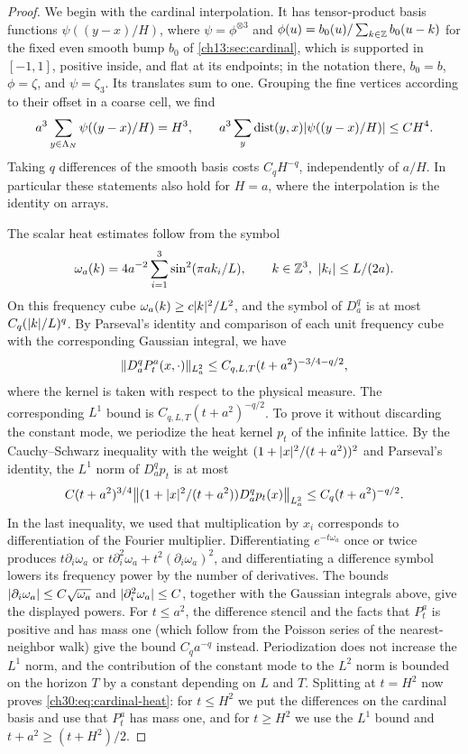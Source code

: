\begin{proof}
We begin with the cardinal interpolation. It has tensor-product basis functions $\psi((y-x)/H)$, where $\psi=\phi^{\otimes3}$ and $\phi(u)=b_0(u)/\sum_{k\in\mathbb Z}b_0(u-k)$ for the fixed even smooth bump $b_0$ of \cref{ch13:sec:cardinal}, which is supported in $[-1,1]$, positive inside, and flat at its endpoints; in the notation there, $b_0=b$, $\phi=\zeta$, and $\psi=\zeta_3$. Its translates sum to one. Grouping the fine vertices according to their offset in a coarse cell, we find
\[
 a^3\sum_{y\in\Lambda_{N}}\psi((y-x)/H)=H^3,\qquad
 a^3\sum_y\operatorname{dist}(y,x)\lvert \psi((y-x)/H)\rvert\le CH^4.
\]
Taking $q$ differences of the smooth basis costs $C_qH^{-q}$, independently of $a/H$. In particular these statements also hold for $H=a$, where the interpolation is the identity on arrays.

The scalar heat estimates follow from the symbol
\[
 \omega_a(k)=4a^{-2}\sum_{i=1}^3\sin^2(\pi ak_i/L),\qquad k\in\mathbb Z^3,\ \lvert k_i\rvert\le L/(2a).
\]
On this frequency cube $\omega_a(k)\ge c\lvert k\rvert^2/L^2$, and the symbol of $D_a^q$ is at most $C_q(\lvert k\rvert/L)^q$. By Parseval's identity and comparison of each unit frequency cube with the corresponding Gaussian integral, we have
\[
 \lVert D_a^qP_t^a(x,\cdot)\rVert_{L_a^2}\le C_{q,L,T}(t+a^2)^{-3/4-q/2},
\]
where the kernel is taken with respect to the physical measure. The corresponding $L^1$ bound is $C_{q,L,T}(t+a^2)^{-q/2}$. To prove it without discarding the constant mode, we periodize the heat kernel $p_t$ of the infinite lattice. By the Cauchy--Schwarz inequality with the weight $(1+\lvert x\rvert^2/(t+a^2))^2$ and Parseval's identity, the $L^1$ norm of $D_a^qp_t$ is at most
\[
 C(t+a^2)^{3/4}\bigl\lVert(1+\lvert x\rvert^2/(t+a^2))D_a^qp_t(x)\bigr\rVert_{L_a^2}\le C_q(t+a^2)^{-q/2}.
\]
In the last inequality, we used that multiplication by $x_i$ corresponds to differentiation of the Fourier multiplier. Differentiating $e^{-t\omega_a}$ once or twice produces $t\partial_i\omega_a$ or $t\partial_i^2\omega_a+t^2(\partial_i\omega_a)^2$, and differentiating a difference symbol lowers its frequency power by the number of derivatives. The bounds $\lvert \partial_i\omega_a\rvert\le C\sqrt{\omega_a}$ and $\lvert \partial_i^2\omega_a\rvert\le C$, together with the Gaussian integrals above, give the displayed powers. For $t\le a^2$, the difference stencil and the facts that $P_t^a$ is positive and has mass one (which follow from the Poisson series of the nearest-neighbor walk) give the bound $C_qa^{-q}$ instead. Periodization does not increase the $L^1$ norm, and the contribution of the constant mode to the $L^2$ norm is bounded on the horizon $T$ by a constant depending on $L$ and $T$. Splitting at $t=H^2$ now proves \eqref{ch30:eq:cardinal-heat}: for $t\le H^2$ we put the differences on the cardinal basis and use that $P_t^a$ has mass one, and for $t\ge H^2$ we use the $L^1$ bound and $t+a^2\ge(t+H^2)/2$.


\end{proof}
